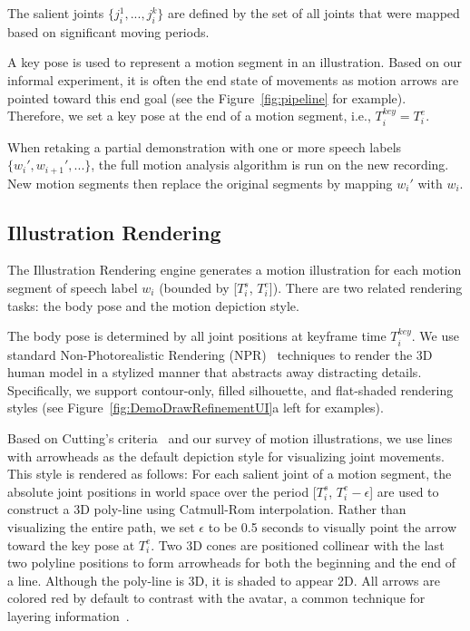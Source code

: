 The salient joints $\{j_i^1, ..., j_i^k\}$ are defined by the set of all joints that were mapped based on significant moving periods.

A key pose is used to represent a motion segment in an illustration. Based on our informal experiment, it is often the end state of movements as motion arrows are pointed toward this end goal (see the Figure~\ref{fig:pipeline} for example). Therefore, we set a key pose at the end of a motion segment, i.e., $T_i^{key} = T_i^e$.

When retaking a partial demonstration with one or more speech labels $\{w_i', w_{i+1}', ...\}$, the full motion analysis algorithm is run on the new recording. New motion segments then replace the original segments by mapping $w_i'$ with $w_i$.


\subsection{Illustration Rendering}

The Illustration Rendering engine generates a motion illustration for each motion segment of speech label $w_i$ (bounded by [$T_i^s$, $T_i^e$]). There are two related rendering tasks: the body pose and the motion depiction style.

The body pose is determined by all joint positions at keyframe time $T_i^{key}$.
We use standard Non-Photorealistic Rendering (NPR)~\cite{gooch1998non} techniques to render the 3D human model in a stylized manner that abstracts away distracting details. Specifically, we support contour-only, filled silhouette, and flat-shaded rendering styles
(see Figure~\ref{fig:DemoDrawRefinementUI}a left for examples).

Based on Cutting's criteria~\cite{cutting_representing_2002} and our survey of motion illustrations, we use lines with arrowheads as the default depiction style for visualizing joint movements.
This style is rendered as follows:
%
For each salient joint of a motion segment, the absolute joint positions in world space over the period [$T_i^s$, $T_i^e - \epsilon$] are used to construct a 3D poly-line using Catmull-Rom interpolation. Rather than visualizing the entire path, we set $\epsilon$ to be 0.5 seconds to visually point the arrow toward the key pose at $T_i^e$.
Two 3D cones are positioned collinear with the last two polyline positions to form arrowheads for both the beginning and the end of a line.
%
Although the poly-line is 3D, it is shaded to appear 2D.
%
All arrows are colored red by default to contrast with the avatar, a common technique for layering information~\cite{tufte1990envisioning}.

